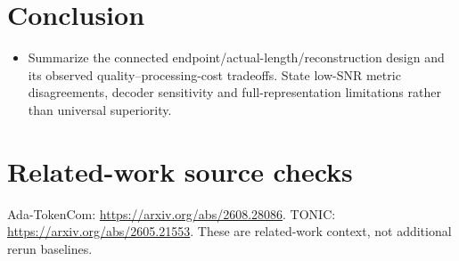 \documentclass[10pt]{article}
\begin{document}
\section{Conclusion}
\begin{itemize}
\item Summarize the connected endpoint/actual-length/reconstruction design and its observed quality--processing-cost tradeoffs. State low-SNR metric disagreements, decoder sensitivity and full-representation limitations rather than universal superiority.
\end{itemize}
\clearpage
\section*{Related-work source checks}
Ada-TokenCom: \url{https://arxiv.org/abs/2608.28086}. TONIC: \url{https://arxiv.org/abs/2605.21553}. These are related-work context, not additional rerun baselines.
\end{document}
